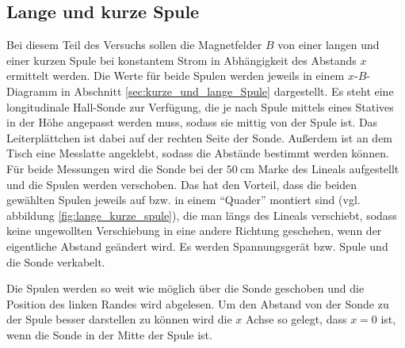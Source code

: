 \subsection{Lange und kurze Spule}
Bei diesem Teil des Versuchs sollen die Magnetfelder $B$ von einer langen und einer kurzen Spule bei konstantem Strom in Abhängigkeit 
des Abstands $x$ ermittelt werden.
Die Werte für beide Spulen werden jeweils in einem $x$-$B$-Diagramm in Abschnitt \ref{sec:kurze_und_lange_Spule} dargestellt.
Es steht eine longitudinale Hall-Sonde zur Verfügung, die je nach Spule mittels eines Statives in der Höhe angepasst werden muss, 
sodass sie mittig von der Spule ist.
Das Leiterplättchen ist dabei auf der rechten Seite der Sonde.
Außerdem ist an dem Tisch eine Messlatte angeklebt, sodass die Abstände bestimmt werden können.
Für beide Messungen wird die Sonde bei der $\qty{50}{\cm}$ Marke des Lineals aufgestellt und die Spulen werden verschoben.
Das hat den Vorteil, dass die beiden gewählten Spulen jeweils auf bzw. in einem \enquote{Quader} montiert sind (vgl. abbildung \ref{fig:lange_kurze_spule}), 
die man längs des Lineals verschiebt,  sodass keine ungewollten Verschiebung in eine andere Richtung geschehen, wenn der eigentliche Abstand geändert wird.
Es werden Spannungsgerät bzw. Spule und die Sonde verkabelt.

\noindent
Die Spulen werden so weit wie möglich über die Sonde geschoben und die Position des linken Randes wird abgelesen.
Um den Abstand von der Sonde zu der Spule besser darstellen zu können wird die $x$ Achse so gelegt, 
dass $x = 0$ ist, wenn die Sonde in der Mitte der Spule ist.


